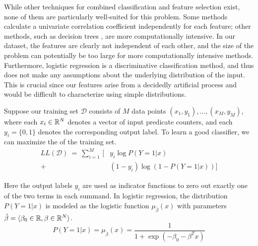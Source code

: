 While other techniques for combined classification and feature
selection exist, none of them are particularly well-suited for this
problem.  Some methods \cite{Golub:MCC:1999,Tibshirani2002} calculate
a univariate correlation coefficient independently for each feature;
other methods, such as decision trees \cite{00000048}, are more
computationally intensive.  In our dataset, the features are clearly
not independent of each other, and the size of the problem can
potentially be too large for more computationally intensive methods.
Furthermore, logistic regression is a discriminative classification
method, and thus does not make any assumptions about the underlying
distribution of the input.  This is crucial since our features arise
from a decidedly artificial process and would be difficult to
characterize using simple distributions.

Suppose our training set $\mathcal{D}$ consists of $M$ data points
$(x_1,y_1), \ldots, (x_M, y_M) $, where each $x_i \in \mathbb{R}^N$ denotes
a vector of input predicate counters, and each $y_i = \{0, 1\}$
denotes the corresponding output label.  To learn a good classifier,
we can maximize the  of the training set.
\begin{equation*}
  \begin{split}
    LL(\mathcal{D}) \:=\:
    \sum_{i=1}^M \, [ & y_i \log P(Y = 1 | x) \\
    + & (1 - y_i) \log (1 - P(Y = 1 | x)) ]
  \end{split}
\end{equation*}

Here the output labels $y_i$ are used as indicator functions to zero
out exactly one of the two terms in each summand.  In logistic
regression, the distribution $P(Y=1|x)$ is modeled as the logistic
function $\mu_{\tilde{\beta}}(x)$ with parameters $\tilde{\beta} = \langle \beta_0 \in
\mathbb{R}, \beta \in \mathbb{R}^N \rangle$.
\begin{equation*}
  P(Y = 1 | x) = \mu_{\tilde{\beta}} (x) = \frac{1}{1 + \exp(- \beta_0 - \beta^T x)}
\end{equation*}

